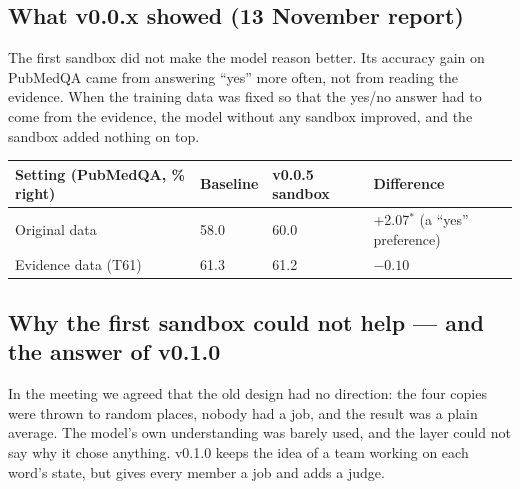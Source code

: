 \documentclass[a4paper,12pt,parskip=half,headsepline]{scrartcl}
\newcommand{\sig}{\ensuremath{^{\ast}}}
\begin{document}
\subsection{What v0.0.x showed (13 November report)}

\begin{plain}
The first sandbox did not make the model reason better. Its accuracy gain on
PubMedQA came from answering ``yes'' more often, not from reading the evidence.
When the training data was fixed so that the yes/no answer had to come from the
evidence, the model without any sandbox improved, and the sandbox added nothing on top.
\end{plain}

\begin{center}
\begin{tabularx}{\linewidth}{@{}Ylll@{}}
\toprule
\textbf{Setting (PubMedQA, \% right)} & \textbf{Baseline} & \textbf{v0.0.5 sandbox} & \textbf{Difference}\\
\midrule
Original data & 58.0 & 60.0 & +2.07\sig{} (a ``yes'' preference)\\
Evidence data (T61) & 61.3 & 61.2 & $-0.10$\\
\bottomrule
\end{tabularx}
\end{center}

\subsection{Why the first sandbox could not help --- and the answer of v0.1.0}

\begin{plain}
In the meeting we agreed that the old design had no direction: the four copies
were thrown to random places, nobody had a job, and the result was a plain average.
The model's own understanding was barely used, and the layer could not say why it
chose anything. v0.1.0 keeps the idea of a team working on each word's state, but
gives every member a job and adds a judge.
\end{plain}
\end{document}
